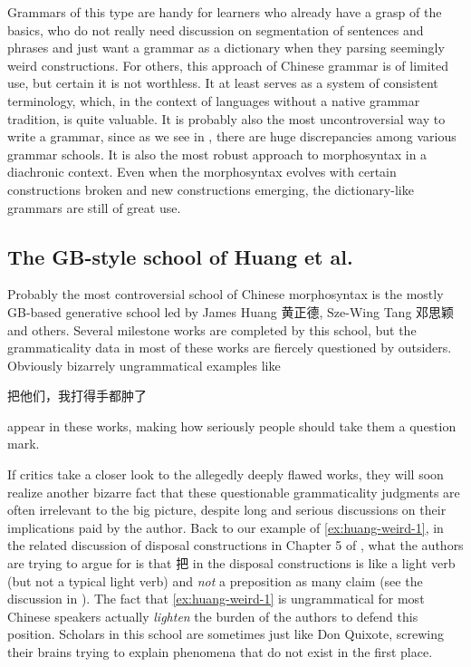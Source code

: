 Grammars of this type are handy for learners who already have a grasp of the basics, who do not really need 
discussion on segmentation of sentences and phrases and just want a grammar as a dictionary when they 
parsing seemingly weird constructions. For others, this approach of Chinese grammar is of limited use,
but certain it is not worthless. It at least serves as a system of consistent terminology, which, in 
the context of languages without a native grammar tradition, is quite valuable. It is probably also 
the most uncontroversial way to write a grammar, since as we see in ,
there are huge discrepancies among various grammar schools. It is also the most robust approach to 
morphosyntax in a diachronic context. Even when the morphosyntax evolves with certain constructions broken 
and new constructions emerging, the dictionary-like grammars are still of great use. 

\subsection{The GB-style school of Huang et al.}\label{sec:gb-grammar}

Probably the most controversial school of Chinese morphosyntax is the mostly GB-based generative school led by James Huang 黄正德, 
Sze-Wing Tang 邓思颖 and others. Several milestone works are completed by this school, but the grammaticality 
data in most of these works are fiercely questioned by outsiders. Obviously bizarrely ungrammatical examples 
like \citep[Section 5.4.2, (65)]{huang2013} 
\begin{exe}
    \ex\label{ex:huang-weird-1} 把他们，我打得手都肿了
\end{exe}
appear in these works, making how seriously people should take them a question mark.

If critics take a closer look to the allegedly deeply flawed works, 
they will soon realize another bizarre fact that 
these questionable grammaticality judgments are often irrelevant to the big picture, 
despite long and serious discussions on their implications paid by the author.
Back to our example of \eqref{ex:huang-weird-1}, 
in the related discussion of disposal constructions in Chapter 5 of \citet{huang2013}, 
what the authors are trying to argue for is that 把 in the disposal constructions 
is like a light verb (but not a typical light verb) and \emph{not} a preposition as many claim 
(see the discussion in ). 
The fact that \eqref{ex:huang-weird-1} is ungrammatical for most Chinese speakers 
actually \emph{lighten} the burden of the authors to defend this position.
Scholars in this school are sometimes just like Don Quixote, 
screwing their brains trying to explain phenomena that do not exist in the first place.

